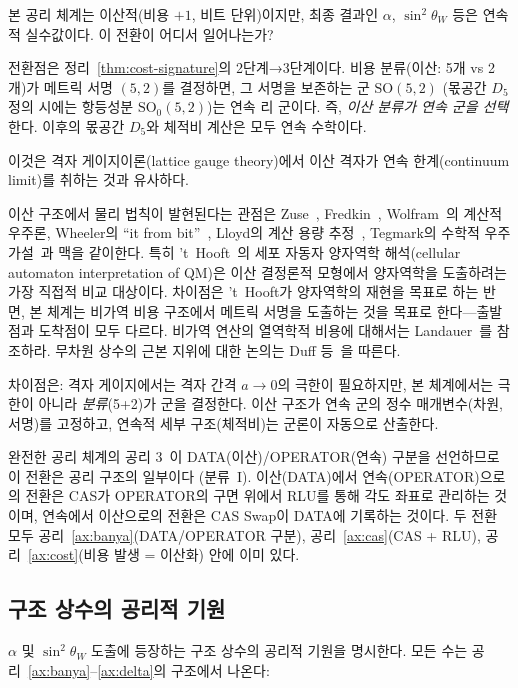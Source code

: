 \documentclass[entropy,article,submit,pdftex,oneauthor]{Definitions/mdpi}
\begin{document}
본 공리 체계는 이산적(비용 $+1$, 비트 단위)이지만, 최종 결과인 $\alpha$, $\sin^2\theta_W$ 등은 연속적 실수값이다. 이 전환이 어디서 일어나는가?

전환점은 정리~\ref{thm:cost-signature}의 2단계→3단계이다. 비용 분류(이산: 5개 vs 2개)가 메트릭 서명 $(5,2)$를 결정하면, 그 서명을 보존하는 군 $\mathrm{SO}(5,2)$ (몫공간 $D_5$ 정의 시에는 항등성분 $\mathrm{SO}_0(5,2)$)는 연속 리 군이다. 즉, \emph{이산 분류가 연속 군을 선택}한다. 이후의 몫공간 $D_5$와 체적비 계산은 모두 연속 수학이다.

이것은 격자 게이지이론(lattice gauge theory)에서 이산 격자가 연속 한계(continuum limit)를 취하는 것과 유사하다.

이산 구조에서 물리 법칙이 발현된다는 관점은 Zuse~\cite{zuse1969}, Fredkin~\cite{fredkin2003}, Wolfram~\cite{wolfram2002}의 계산적 우주론, Wheeler의 ``it from bit''~\cite{wheeler1990}, Lloyd의 계산 용량 추정~\cite{lloyd2002}, Tegmark의 수학적 우주 가설~\cite{tegmark2008}과 맥을 같이한다. 특히 't~Hooft~\cite{thooft2016}의 세포 자동자 양자역학 해석(cellular automaton interpretation of QM)은 이산 결정론적 모형에서 양자역학을 도출하려는 가장 직접적 비교 대상이다. 차이점은 't~Hooft가 양자역학의 재현을 목표로 하는 반면, 본 체계는 비가역 비용 구조에서 메트릭 서명을 도출하는 것을 목표로 한다---출발점과 도착점이 모두 다르다. 비가역 연산의 열역학적 비용에 대해서는 Landauer~\cite{landauer1961}를 참조하라. 무차원 상수의 근본 지위에 대한 논의는 Duff 등~\cite{duff2002}을 따른다.

차이점은: 격자 게이지에서는 격자 간격 $a \to 0$의 극한이 필요하지만, 본 체계에서는 극한이 아니라 \emph{분류}(5+2)가 군을 결정한다. 이산 구조가 연속 군의 정수 매개변수(차원, 서명)를 고정하고, 연속적 세부 구조(체적비)는 군론이 자동으로 산출한다.

완전한 공리 체계의 공리 3~\cite{han2026}이 DATA(이산)/OPERATOR(연속) 구분을 선언하므로 이 전환은 공리 구조의 일부이다 (분류~I). 이산(DATA)에서 연속(OPERATOR)으로의 전환은 CAS가 OPERATOR의 구면 위에서 RLU를 통해 각도 좌표로 관리하는 것이며, 연속에서 이산으로의 전환은 CAS Swap이 DATA에 기록하는 것이다. 두 전환 모두 공리~\ref{ax:banya}(DATA/OPERATOR 구분), 공리~\ref{ax:cas}(CAS + RLU), 공리~\ref{ax:cost}(비용 발생 = 이산화) 안에 이미 있다.

\subsection{구조 상수의 공리적 기원}

$\alpha$ 및 $\sin^2\theta_W$ 도출에 등장하는 구조 상수의 공리적 기원을 명시한다. 모든 수는 공리~\ref{ax:banya}--\ref{ax:delta}의 구조에서 나온다:
\end{document}
